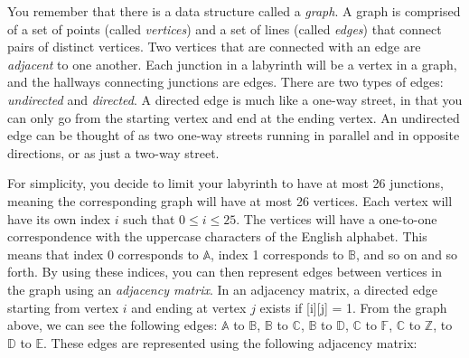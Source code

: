 \documentclass[11pt]{article}
\begin{document}
\noindent You remember that there is a data structure called a \emph{graph}. A
graph is comprised of a set of points (called \emph{vertices}) and a set of
lines (called \emph{edges}) that connect pairs of distinct vertices. Two
vertices that are connected with an edge are \emph{adjacent} to one another.
Each junction in a labyrinth will be a vertex in a graph, and the hallways
connecting junctions are edges. There are two types of edges: \emph{undirected}
and \emph{directed}. A directed edge is much like a one-way street, in that you
can only go from the starting vertex and end at the ending vertex. An undirected
edge can be thought of as two one-way streets running in parallel and in
opposite directions, or as just a two-way street.

\begin{center}
\end{center}

For simplicity, you decide to limit your labyrinth to have at most 26 junctions,
meaning the corresponding graph will have at most 26 vertices. Each vertex will
have its own index $i$ such that $0 \leq i \leq 25$. The vertices will have a
one-to-one correspondence with the uppercase characters of the English
alphabet. This means that index 0 corresponds to $\mathbb{A}$, index 1 corresponds to
$\mathbb{B}$, and so on and so forth. By using these indices, you can then represent
edges between vertices in the graph using an \emph{adjacency matrix}. In an
adjacency matrix, a directed edge starting from vertex $i$ and ending at vertex
$j$ exists if [i][j] = 1. From the graph above, we can see the
following edges: $\mathbb{A}$ to $\mathbb{B}$, $\mathbb{B}$ to $\mathbb{C}$, $\mathbb{B}$ to
$\mathbb{D}$,
$\mathbb{C}$ to $\mathbb{F}$, $\mathbb{C}$ to $\mathbb{Z}$, to $\mathbb{D}$ to $\mathbb{E}$.
These edges are represented using the following adjacency matrix:
\end{document}
